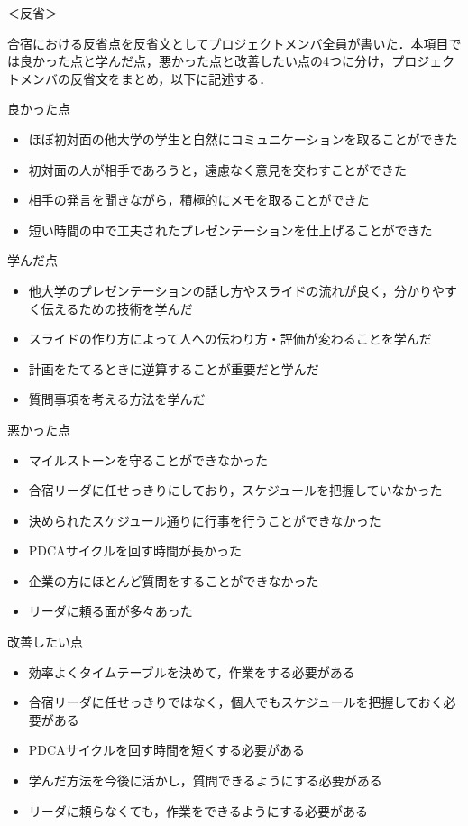 \par
＜反省＞
\par
合宿における反省点を反省文としてプロジェクトメンバ全員が書いた．本項目では良かった点と学んだ点，悪かった点と改善したい点の4つに分け，プロジェクトメンバの反省文をまとめ，以下に記述する．
\par
良かった点
\begin{itemize}
\item ほぼ初対面の他大学の学生と自然にコミュニケーションを取ることができた
\item 初対面の人が相手であろうと，遠慮なく意見を交わすことができた
\item 相手の発言を聞きながら，積極的にメモを取ることができた
\item 短い時間の中で工夫されたプレゼンテーションを仕上げることができた
\end{itemize}
\par
学んだ点
\begin{itemize}
\item 他大学のプレゼンテーションの話し方やスライドの流れが良く，分かりやすく伝えるための技術を学んだ
\item スライドの作り方によって人への伝わり方・評価が変わることを学んだ
\item 計画をたてるときに逆算することが重要だと学んだ
\item 質問事項を考える方法を学んだ
\end{itemize}
\par
悪かった点
\begin{itemize}
\item マイルストーンを守ることができなかった
\item 合宿リーダに任せっきりにしており，スケジュールを把握していなかった
\item 決められたスケジュール通りに行事を行うことができなかった
\item PDCAサイクルを回す時間が長かった
\item 企業の方にほとんど質問をすることができなかった
\item リーダに頼る面が多々あった
\end{itemize}
\par
改善したい点
\begin{itemize}
\item 効率よくタイムテーブルを決めて，作業をする必要がある
\item 合宿リーダに任せっきりではなく，個人でもスケジュールを把握しておく必要がある
\item PDCAサイクルを回す時間を短くする必要がある
\item 学んだ方法を今後に活かし，質問できるようにする必要がある
\item リーダに頼らなくても，作業をできるようにする必要がある
\end{itemize}
